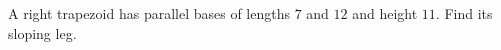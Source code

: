 A right trapezoid has parallel bases of lengths $7$ and $12$ and height $11$. Find its sloping leg.
